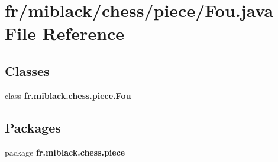 \section{fr/miblack/chess/piece/\-Fou.java File Reference}
\label{Fou_8java}
\subsection*{Classes}
\begin{DoxyCompactItemize}
\item 
class {\bf fr.\-miblack.\-chess.\-piece.\-Fou}
\end{DoxyCompactItemize}
\subsection*{Packages}
\begin{DoxyCompactItemize}
\item 
package {\bf fr.\-miblack.\-chess.\-piece}
\end{DoxyCompactItemize}
